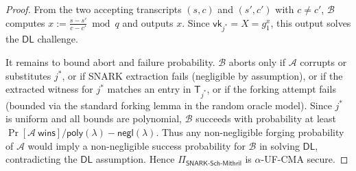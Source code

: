 \documentclass{article}
\newcommand{\vk}[0]{\mathsf{vk}}
\newcommand{\negl}{\mathsf{negl}}
\begin{document}
\begin{proof}
From the two accepting transcripts $(s,c)$ and $(s',c')$ with $c\neq c'$, $\mathcal{B}$ computes $x := \frac{s-s'}{c-c'}\bmod q$ and outputs $x$. Since $\vk_{j^\ast}=X=g_1^{x}$, this output solves the $\mathsf{DL}$ challenge.

It remains to bound abort and failure probability. $\mathcal{B}$ aborts only if $\mathcal{A}$ corrupts or substitutes $j^\ast$, or if SNARK extraction fails (negligible by assumption), or if the extracted witness for $j^\ast$ matches an entry in $\mathsf{T}_{j^\ast}$, or if the forking attempt fails (bounded via the standard forking lemma in the random oracle model). Since $j^\ast$ is uniform and all bounds are polynomial, $\mathcal{B}$ succeeds with probability at least $\Pr[\mathcal{A}\ \mathsf{wins}]/\mathsf{poly}(\lambda)-\negl(\lambda)$. Thus any non-negligible forging probability of $\mathcal{A}$ would imply a non-negligible success probability for $\mathcal{B}$ in solving $\mathsf{DL}$, contradicting the $\mathsf{DL}$ assumption. Hence $\Pi_{\mathsf{SNARK\text{-}Sch\text{-}Mithril}}$ is $\alpha$-\textsf{UF-CMA} secure.
\end{proof}
\end{document}
